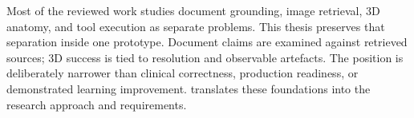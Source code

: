 Most of the reviewed work studies document grounding, image retrieval, 3D anatomy, and tool execution as separate problems. This thesis preserves that separation inside one prototype. Document claims are examined against retrieved sources; 3D success is tied to resolution and observable artefacts. The position is deliberately narrower than clinical correctness, production readiness, or demonstrated learning improvement.  translates these foundations into the research approach and requirements.
